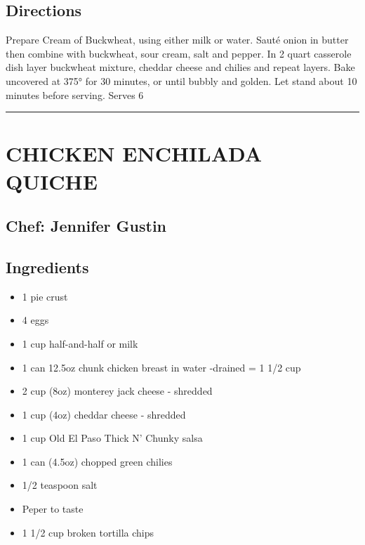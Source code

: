 \documentclass[
]{book}
\providecommand{\tightlist}{%
  \setlength{\itemsep}{0pt}\setlength{\parskip}{0pt}}
\begin{document}
\hypertarget{directions-47}{%
\subsection*{Directions}\label{directions-47}}


Prepare Cream of Buckwheat, using either milk or water. Sauté onion in butter then combine with buckwheat, sour cream, salt and pepper. In 2 quart casserole dish layer buckwheat mixture, cheddar cheese and chilies and repeat layers. Bake uncovered at 375° for 30 minutes, or until bubbly and golden. Let stand about 10 minutes before serving. Serves 6

\begin{center}\rule{0.5\linewidth}{0.5pt}\end{center}

\hypertarget{chicken-enchilada-quiche}{%
\section*{CHICKEN ENCHILADA QUICHE}\label{chicken-enchilada-quiche}}


\hypertarget{chef-jennifer-gustin-8}{%
\subsection*{Chef: Jennifer Gustin}\label{chef-jennifer-gustin-8}}


\hypertarget{ingredients-48}{%
\subsection*{Ingredients}\label{ingredients-48}}


\begin{itemize}
\tightlist
\item
  1 pie crust
\item
  4 eggs
\item
  1 cup half-and-half or milk
\item
  1 can 12.5oz chunk chicken breast in water -drained = 1 1/2 cup
\item
  2 cup (8oz) monterey jack cheese - shredded
\item
  1 cup (4oz) cheddar cheese - shredded
\item
  1 cup Old El Paso Thick N' Chunky salsa
\item
  1 can (4.5oz) chopped green chilies
\item
  1/2 teaspoon salt
\item
  Peper to taste
\item
  1 1/2 cup broken tortilla chips
\end{itemize}
\end{document}
